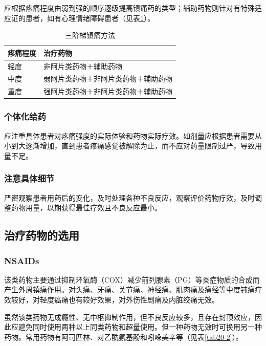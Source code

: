 应根据疼痛程度由弱到强的顺序逐级提高镇痛药的类型；辅助药物则针对有特殊适应证的患者，如有心理情绪障碍患者（见表\ref{tab20-1}）。


\begin{longtable}[]{lp{5cm}}
    \caption{三阶梯镇痛方法}
    \label{tab20-1}\\
\toprule
疼痛程度 & 治疗药物\tabularnewline
\midrule
\endhead
轻度 & 非阿片类药物＋辅助药物\tabularnewline
中度 & 弱阿片类药物＋非阿片类药物＋辅助药物\tabularnewline
重度 & 强阿片类药物＋非阿片类药物＋辅助药物\tabularnewline
\bottomrule
\end{longtable}

\subsubsection{个体化给药}

应注重具体患者对疼痛强度的实际体验和药物实际疗效。如剂量应根据患者需要从小到大逐渐增加，直到患者疼痛感觉被解除为止，而不应对药量限制过严，导致用量不足。

\subsubsection{注意具体细节}

严密观察患者用药后的变化，及时处理各种不良反应，观察评价药物疗效，及时调整药物用量，以期获得最佳疗效且不良反应最小。

\subsection{治疗药物的选用}

\subsubsection{NSAIDs}

该类药物主要通过抑制环氧酶（COX）减少前列腺素（PG）等炎症物质的合成而产生外周镇痛作用。对头痛、牙痛、关节痛、神经痛、肌肉痛及痛经等中度钝痛疗效较好，对轻度癌痛也有较好效果，对外伤性剧痛及内脏绞痛无效。

虽然该类药物无成瘾性、无中枢抑制作用，但不良反应较多，且存在封顶效应，因此应避免同时使用两种以上同类药物和超量使用。但一种药物无效时可换用另一种药物。常用药物有阿司匹林、对乙酰氨基酚和吲哚美辛等（见表\ref{tab20-2}）。

